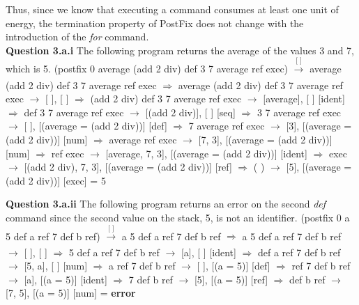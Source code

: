 \documentclass[12pt]{report}
\begin{document}
Thus, since we know that executing a command consumes at least one unit of energy, the termination property of PostFix does not change with the introduction of the {\em for} command. \\

{\bf Question 3.a.i} \newline
The following program returns the average of the values 3 and 7, which is 5. \newline
(postfix 0 average (add 2 div) def 3 7 average ref exec) $\xrightarrow[ ]{\text{[ ]}}$ average (add 2 div) def 3 7 average ref exec \newline
$\Rightarrow$ average (add 2 div) def 3 7 average ref exec $\rightarrow$ [ ], [ ] \newline
$\Rightarrow$ (add 2 div) def 3 7 average ref exec $\rightarrow$ [average], [ ] \hfil [ident] \newline
$\Rightarrow$ def 3 7 average ref exec $\rightarrow$ [(add 2 div)], [ ] \hfil [seq] \newline
$\Rightarrow$ 3 7 average ref exec $\rightarrow$ [ ], [(average = (add 2 div))] \hfil [def] \newline
$\Rightarrow$ 7 average ref exec $\rightarrow$ [3], [(average = (add 2 div))] \hfil [num] \newline
$\Rightarrow$ average ref exec $\rightarrow$ [7, 3], [(average = (add 2 div))] \hfil [num] \newline
$\Rightarrow$ ref exec $\rightarrow$ [average, 7, 3], [(average = (add 2 div))] \hfil [ident] \newline
$\Rightarrow$ exec $\rightarrow$ [(add 2 div), 7, 3], [(average = (add 2 div))] \hfil [ref] \newline
$\Rightarrow$ ( ) $\rightarrow$ [5], [(average = (add 2 div))] \hfil [exec] \newline
= 5 \newline

{\bf Question 3.a.ii} \newline
The following program returns an error on the second {\em def} command since the second value on the stack, 5, is not an identifier. \newline
(postfix 0 a 5 def a ref 7 def b ref) $\xrightarrow[ ]{\text{[ ]}}$ a 5 def a ref 7 def b ref \newline
$\Rightarrow$ a 5 def a ref 7 def b ref $\rightarrow$ [ ], [ ] \newline
$\Rightarrow$ 5 def a ref 7 def b ref $\rightarrow$ [a], [ ] \hfil [ident] \newline
$\Rightarrow$ def a ref 7 def b ref $\rightarrow$ [5, a], [ ] \hfil [num] \newline
$\Rightarrow$ a ref 7 def b ref $\rightarrow$ [ ], [(a = 5)] \hfil [def] \newline
$\Rightarrow$ ref 7 def b ref $\rightarrow$ [a], [(a = 5)] \hfil [ident] \newline
$\Rightarrow$ 7 def b ref $\rightarrow$ [5], [(a = 5)] \hfil [ref] \newline
$\Rightarrow$ def b ref $\rightarrow$ [7, 5], [(a = 5)] \hfil [num] \newline
= {\bf error} \newline
\end{document}
